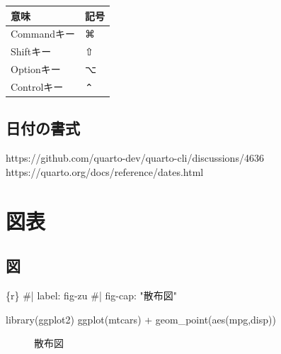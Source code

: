 \documentclass[
  b5paper,
  xelatex, ja=standard]{bxjsbook}
\newenvironment{Shaded}{\begin{snugshade}}{\end{snugshade}}
\newcommand{\InformationTok}[1]{\textcolor[rgb]{0.37,0.37,0.37}{#1}}
\begin{document}
\begin{longtable}[]{@{}ll@{}}
\toprule\noalign{}
意味 & 記号 \\
\midrule\noalign{}
\endhead
\bottomrule\noalign{}
\endlastfoot
Commandキー & ⌘ \\
Shiftキー & ⇧ \\
Optionキー & ⌥ \\
Controlキー & ⌃ \\
\end{longtable}

\section{日付の書式}\label{ux65e5ux4ed8ux306eux66f8ux5f0f}

https://github.com/quarto-dev/quarto-cli/discussions/4636
https://quarto.org/docs/reference/dates.html


\chapter{図表}\label{sec-caution}

\section{図}\label{ux56f3}

\begin{Shaded}
\begin{Highlighting}[]
\InformationTok{\textasciigrave{}\textasciigrave{}\textasciigrave{}\{r\}}
\InformationTok{\#| label: fig{-}zu}
\InformationTok{\#| fig{-}cap: "散布図"}

\InformationTok{library(ggplot2)}
\InformationTok{ggplot(mtcars) +}
\InformationTok{  geom\_point(aes(mpg,disp))}
\InformationTok{\textasciigrave{}\textasciigrave{}\textasciigrave{}}
\end{Highlighting}
\end{Shaded}

\begin{figure}[H]


\caption{\label{fig-zu}散布図}

\end{figure}%
\end{document}
